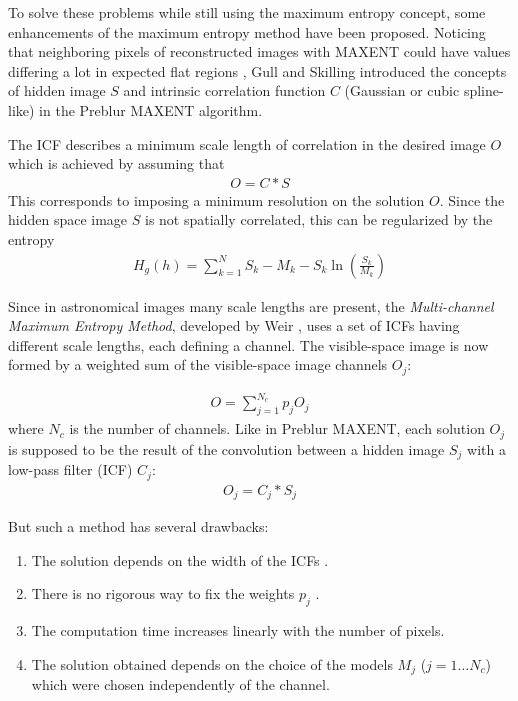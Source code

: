  To solve these problems while still using the maximum entropy concept, some 
enhancements of the maximum entropy method have been proposed.
Noticing that neighboring pixels of reconstructed images with MAXENT 
could have values differing a lot in expected flat regions \cite{entropy:charter89}, 
Gull and Skilling introduced the concepts of hidden image $S$ and intrinsic 
 correlation function $C$ (Gaussian or cubic spline-like) 
in the Preblur MAXENT algorithm.

 The ICF describes a minimum scale length of correlation in the desired 
image $O$ which is achieved by assuming that
\begin{eqnarray}
 O=C*S
\end{eqnarray}
This corresponds to imposing a  
minimum resolution on the solution $O$. 
Since the hidden space image $S$ is not 
spatially correlated, this can be regularized by the entropy 
\begin{eqnarray}
H_g(h)=\sum_{k=1}^N  S_k - M_k - S_k \ln(\frac{S_k}{M_k})
\end{eqnarray}

Since in astronomical images many scale lengths are present, the 
{\it Multi-channel Maximum Entropy Method}, developed by Weir 
\cite{entropy:weir91,entropy:weir92}, uses a set of 
ICFs having different scale lengths, each defining a channel. The 
visible-space image is now formed by a weighted sum of 
 the visible-space image
channels $O_j$:
   
\begin{eqnarray}
  O= \sum_{j=1}^{N_c} p_j O_j
\end{eqnarray}
where $N_c$ is the number of channels.
Like in Preblur MAXENT, each solution $O_j$ is supposed to be the result of the
convolution between a hidden image $S_j$ with a low-pass filter (ICF) $C_j$:
\begin{eqnarray}
O_j = C_j * S_j
\end{eqnarray}

But such a method has several drawbacks:
\begin{enumerate}
\item The solution depends on the width of the ICFs \cite{entropy:bontekoe94}.
\item There is no rigorous way to fix the weights $p_j$ \cite{entropy:bontekoe94}.
\item The computation time increases linearly with the number of pixels.
\item The solution obtained depends on the choice of the models $M_j$ 
($j = 1 \dots N_c$) which were chosen independently of the channel.
\end{enumerate}

